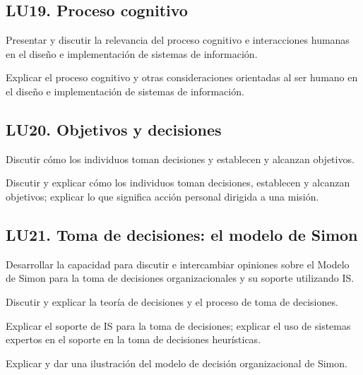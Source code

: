 \subsection{LU19. Proceso cognitivo}\label{sec:LU19}
\begin{LearningUnit}
\begin{LUGoal}
\item Presentar y discutir la relevancia del proceso cognitivo e interacciones humanas en el diseño e implementación de sistemas de información.
\end{LUGoal}

\begin{LUObjective}
\item Explicar el proceso cognitivo y otras consideraciones orientadas al ser humano en el diseño e implementación de sistemas de información.
\end{LUObjective}
\end{LearningUnit}

\subsection{LU20. Objetivos y decisiones}\label{sec:LU20}
\begin{LearningUnit}
\begin{LUGoal}
\item Discutir cómo los individuos toman decisiones y establecen y alcanzan objetivos.
\end{LUGoal}

\begin{LUObjective}
\item Discutir y explicar cómo los individuos toman decisiones, establecen y alcanzan objetivos; explicar lo que significa acción personal dirigida a una misión.
\end{LUObjective}
\end{LearningUnit}

\subsection{LU21. Toma de decisiones: el modelo de Simon}\label{sec:LU21}
\begin{LearningUnit}
\begin{LUGoal}
\item Desarrollar la capacidad para discutir e intercambiar opiniones sobre  el Modelo de Simon para la toma de decisiones organizacionales y su soporte utilizando IS.
\end{LUGoal}

\begin{LUObjective}
\item Discutir y explicar la teoría de decisiones y el proceso de toma de decisiones.
\item Explicar el soporte de IS para la toma de decisiones; explicar el uso de sistemas expertos en el soporte en la toma de decisiones heurísticas.
\item Explicar y dar una ilustración del modelo de decisión organizacional de Simon.
\end{LUObjective}
\end{LearningUnit}

